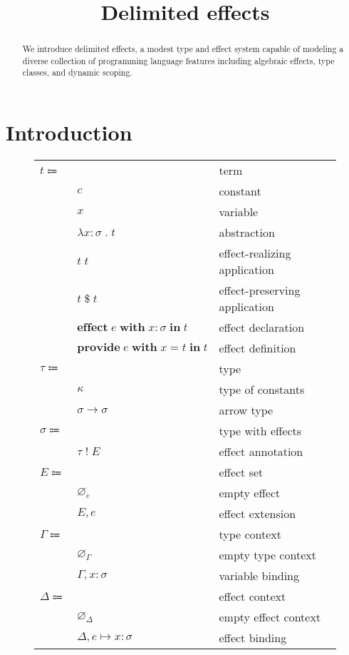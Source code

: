 \documentclass[12pt]{article}
\title{Delimited effects}
\date{}
\newcommand\eterm{t}
\newcommand\econst{c}
\newcommand\evar{x}
\newcommand\eabs[2]{\lambda #1 \; . \; #2} %
\newcommand\eapp[2]{#1 \; #2}
\newcommand\eappx[2]{#1 \; \$ \; #2}
\newcommand\eeffect[4]{\textbf{effect} \; #1 \; \textbf{with} \; \tanno{#2}{#3} \; \textbf{in} \; #4}
\newcommand\eprovide[4]{\textbf{provide} \; #1 \; \textbf{with} \; #2 = #3 \; \textbf{in} \; #4}
\newcommand\ttype{\tau}
\newcommand\tconst{\kappa}
\newcommand\tarrow[2]{#1 \rightarrow #2} %
\newcommand\tanno[2]{#1 : #2} %
\newcommand\tx{\sigma}
\newcommand\twithx[2]{#1 \; ! \; #2} %
\newcommand\xeffect{e}
\newcommand\xeffects{E}
\newcommand\xempty{\varnothing_{\xeffect}}
\newcommand\xextend[2]{#1, #2}
\newcommand\ccontext{\Gamma}
\newcommand\cempty{\varnothing_{\ccontext}}
\newcommand\cextend[2]{#1, #2}
\newcommand\dcontext{\Delta}
\newcommand\dempty{\varnothing_{\dcontext}}
\newcommand\dextend[2]{#1, #2}
\newcommand\deffect[3]{#1 \mapsto \tanno{#2}{#3}} %
\begin{document}
  \maketitle

  \begin{abstract}
    We introduce delimited effects, a modest type and effect system capable of modeling a diverse collection of programming language features including algebraic effects, type classes, and dynamic scoping.
  \end{abstract}

  \section{Introduction}

  \begin{figure}
    \begin{mdframed}
      \begin{center}
        \begin{tabular}{l l l}
          $\eterm \Coloneqq $ & & term \\
          & $\econst$ & constant \\
          & $\evar$ & variable \\
          & $\eabs{\tanno{\evar}{\tx}}{\eterm}$ & abstraction \\
          & $\eapp{\eterm}{\eterm}$ & effect-realizing application \\
          & $\eappx{\eterm}{\eterm}$ & effect-preserving application \\
          & $\eeffect{\xeffect}{\evar}{\tx}{\eterm}$ & effect declaration \\
          & $\eprovide{\xeffect}{\evar}{\eterm}{\eterm}$ & effect definition \\
          $\ttype \Coloneqq$ & & type \\
          & $\tconst$ & type of constants \\
          & $\tarrow{\tx}{\tx}$ & arrow type \\
          $\tx \Coloneqq$ & & type with effects \\
          & $\twithx{\ttype}{\xeffects}$ & effect annotation \\
          $\xeffects \Coloneqq$ & & effect set \\
          & $\xempty$ & empty effect \\
          & $\xextend{\xeffects}{\xeffect}$ & effect extension \\
          $\ccontext \Coloneqq$ & & type context \\
          & $\cempty$ & empty type context \\
          & $\cextend{\ccontext}{\tanno{\evar}{\tx}}$ & variable binding \\
          $\dcontext \Coloneqq$ & & effect context \\
          & $\dempty$ & empty effect context \\
          & $\dextend{\dcontext}{\deffect{\xeffect}{\evar}{\tx}}$ & effect binding \\
        \end{tabular}
      \end{center}


\end{mdframed}
\end{figure}
\end{document}
